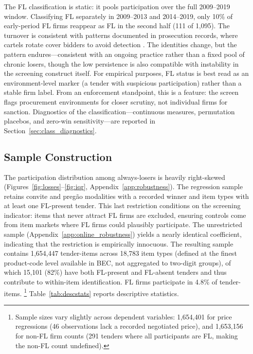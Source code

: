 The FL classification is static: it pools participation over the full
2009--2019 window. Classifying FL separately in 2009--2013 and
2014--2019, only 10\% of early-period FL firms reappear as FL in the
second half (111 of 1,095). The turnover is consistent with patterns documented in prosecution
records, where cartels rotate cover bidders to avoid detection
\citep{marshall2012economics}. The identities change, but the
pattern endures---consistent with an ongoing practice rather than a
fixed pool of chronic losers, though the low persistence is also
compatible with instability in the screening construct itself. For empirical purposes,
FL status is best read as an environment-level marker (a tender with
suspicious participation) rather than a stable firm label. From an
enforcement standpoint, this is a feature: the screen flags
procurement environments for closer scrutiny, not individual firms
for sanction.
Diagnostics of the classification---continuous measures, permutation
placebos, and zero-win sensitivity---are reported in
Section~\ref{sec:class_diagnostics}.

\subsection{Sample Construction}
\label{sec:sample}

The participation distribution among always-losers is heavily
right-skewed (Figures~\ref{fig:losses}--\ref{fig:iqr},
Appendix~\ref{app:robustness}).
The regression sample retains convite and preg\~ao modalities with a
recorded winner and item types with at least one FL-present tender.
This last restriction conditions on the screening indicator: items
that never attract FL firms are excluded, ensuring controls come from item
markets where FL firms could plausibly participate. The unrestricted
sample (Appendix~\ref{app:online_robustness}) yields a nearly
identical coefficient, indicating that the restriction is empirically
innocuous.
The resulting sample contains 1,654,447 tender-items across 18,783
item types (defined at the finest product-code level available in BEC,
not aggregated to two-digit groups), of which 15,101 (82\%) have both
FL-present and FL-absent tenders and thus contribute to within-item
identification. FL firms participate in 4.8\% of tender-items.%
\footnote{Sample sizes vary slightly across dependent variables:
1,654,401 for price regressions (46 observations lack a recorded
negotiated price), and 1,653,156 for non-FL firm counts (291 tenders
where all participants are FL, making the non-FL count undefined).}
Table~\ref{tab:descstats} reports descriptive statistics.

